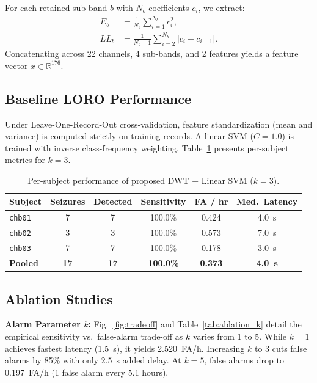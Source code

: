 \documentclass[10pt,twocolumn,letterpaper]{article}
\begin{document}
For each retained sub-band $b$ with $N_b$ coefficients $c_i$, we extract:
\begin{align}
E_b &= \frac{1}{N_b} \sum_{i=1}^{N_b} c_i^2, \label{eq:energy} \\
LL_b &= \frac{1}{N_b - 1} \sum_{i=2}^{N_b} |c_i - c_{i-1}|. \label{eq:linelength}
\end{align}
Concatenating across 22 channels, 4 sub-bands, and 2 features yields a feature vector $x \in \mathbb{R}^{176}$.

\subsection{Baseline LORO Performance}
Under Leave-One-Record-Out cross-validation, feature standardization (mean and variance) is computed strictly on training records. A linear SVM ($C=1.0$) is trained with inverse class-frequency weighting. Table~\ref{tab:baseline} presents per-subject metrics for $k=3$.

\begin{table}[t]
\centering
\small
\caption{Per-subject performance of proposed DWT + Linear SVM ($k=3$).}
\label{tab:baseline}
\begin{tabularx}{\columnwidth}{lccccc}
\toprule
\textbf{Subject} & \textbf{Seizures} & \textbf{Detected} & \textbf{Sensitivity} & \textbf{FA / hr} & \textbf{Med.\ Latency} \\
\midrule
\texttt{chb01} & 7 & 7 & 100.0\% & 0.424 & 4.0~s \\
\texttt{chb02} & 3 & 3 & 100.0\% & 0.573 & 7.0~s \\
\texttt{chb03} & 7 & 7 & 100.0\% & 0.178 & 3.0~s \\
\midrule
\textbf{Pooled} & \textbf{17} & \textbf{17} & \textbf{100.0\%} & \textbf{0.373} & \textbf{4.0~s} \\
\bottomrule
\end{tabularx}
\end{table}

\subsection{Ablation Studies}
\textbf{Alarm Parameter $k$:} Fig.~\ref{fig:tradeoff} and Table~\ref{tab:ablation_k} detail the empirical sensitivity vs.\ false-alarm trade-off as $k$ varies from 1 to 5. While $k=1$ achieves fastest latency (1.5~s), it yields 2.520~FA/h. Increasing $k$ to 3 cuts false alarms by 85\% with only 2.5~s added delay. At $k=5$, false alarms drop to 0.197~FA/h (1 false alarm every 5.1 hours).
\end{document}
